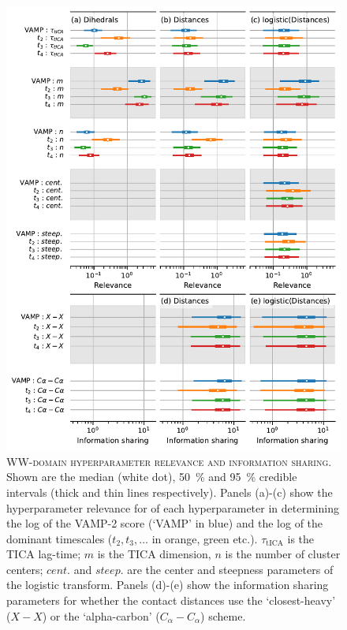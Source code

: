 \documentclass{article}
\begin{document}
\begin{figure}[h]
    \centering
    \includegraphics[height=0.8\textheight]{figures/sensitivities/gtt_sensitivity.pdf}
    \caption{\textsc{WW-domain hyperparameter relevance and information sharing}. Shown are the  median (white dot), \SI{50}{\percent} and \SI{95}{\percent} credible intervals (thick and thin lines respectively).  Panels (a)-(c) show the hyperparameter relevance for of each hyperparameter in determining the log of the VAMP-2 score (`VAMP' in blue) and the log of the dominant timescales ($t_{2}, t_{3}, ...$ in orange, green etc.). $\tau_{\mathrm{tICA}}$ is the TICA lag-time; $m$ is the TICA dimension, $n$ is the number of cluster centers; $cent.$ and $steep.$ are the center and steepness parameters of the logistic transform. Panels (d)-(e) show the information sharing parameters for whether the contact distances use the `closest-heavy' ($X-X$) or the `alpha-carbon' ($C_{\alpha}-C_{\alpha}$) scheme.  }
    \label{fig:gtt_sense}
\end{figure}
\end{document}
